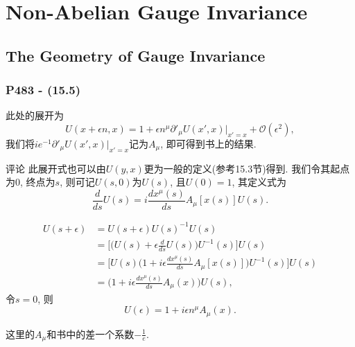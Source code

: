 \chapter{Non-Abelian Gauge Invariance}


\section{The Geometry of Gauge Invariance}

\subsection{P483 - (15.5)}

此处的展开为
\begin{equation}\label{eq: expand_of_U(y,x)}
  U(x+\epsilon n, x) = 1 + \epsilon n^{\mu} \partial'_{\mu}U(x', x)|_{x' = x} + \mathcal{O}(\epsilon^2),
\end{equation}
我们将$ie^{-1}\partial'_{\mu}U(x', x)|_{x' = x}$记为$A_{\mu}$, 即可得到书上的结果.

\begin{mybox}{评论}
  此展开式也可以由$U(y, x)$更为一般的定义(参考15.3节)得到.
  我们令其起点为$0$, 终点为$s$, 则可记$U(s, 0)$为$U(s)$, 且$U(0) = 1$, 其定义式为
  \begin{equation}
    \frac{d}{ds}U(s) = i\frac{dx^{\mu}(s)}{ds}A_{\mu}[x(s)]U(s).
  \end{equation}

  \begin{equation}
    \begin{aligned}
      U(s+\epsilon) & = U(s+\epsilon)U(s)^{-1}U(s)                                                                      \\
                    & = \biggl[\biggl(U(s) + \epsilon\frac{d}{ds}U(s) \biggr)U^{-1}(s)\biggr]U(s)                       \\
                    & = \biggl[U(s)\biggl(1 + i\epsilon \frac{dx^{\mu}(s)}{ds}A_{\mu}[x(s)]\biggr)U^{-1}(s) \biggr]U(s) \\
                    & = \biggl(1 + i\epsilon \frac{dx^{\mu}(s)}{ds}A_{\mu}(x)\biggr)U(s),
    \end{aligned}
  \end{equation}
  令$s=0$, 则
  \begin{equation}
    U(\epsilon) = 1 + i\epsilon n^{\mu} A_{\mu}(x).
  \end{equation}

  这里的$A_{\mu}$和书中的差一个系数$-\frac{1}{e}$.
\end{mybox}


